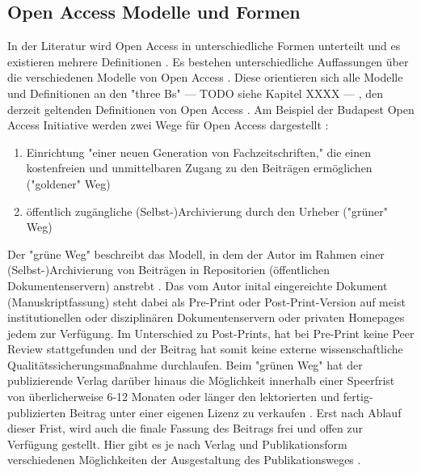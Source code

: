 \subsection{Open Access Modelle und Formen}

In der Literatur wird Open Access in unterschiedliche Formen unterteilt und es existieren mehrere Definitionen \cite{CREATe_2014} \cite{albert_2006_open_implications}. Es bestehen unterschiedliche Auffassungen über die verschiedenen Modelle von Open Access \cite{CREATe_2014} \cite{cite:22b} \cite{lewis_2012_inevitability}. Diese orientieren sich alle Modelle und Definitionen an den "three Bs" --- TODO siehe Kapitel XXXX --- , den derzeit geltenden Definitionen von Open Access \cite{Adema_2014_open_access}. Am Beispiel der Budapest Open Access Initiative werden zwei Wege für Open Access dargestellt \cite{albert_2006_open_implications}: 
\begin{enumerate}
\item Einrichtung "einer neuen Generation von Fachzeitschriften," die einen kostenfreien und unmittelbaren Zugang zu den Beiträgen ermöglichen ("goldener" Weg)
\item öffentlich zugängliche (Selbst-)Archivierung durch den Urheber ("grüner" Weg)
\end{enumerate}

Der "grüne Weg" beschreibt das Modell, in dem der Autor im Rahmen einer (Selbst-)Archivierung von Beiträgen in Repositorien (öffentlichen Dokumentenservern) anstrebt \cite{suchen}. Das vom Autor inital eingereichte Dokument (Manuskriptfassung) steht dabei als Pre-Print oder Post-Print-Version auf meist institutionellen oder disziplinären Dokumentenservern \cite{suchen} oder privaten Homepages \cite{suchen} jedem zur Verfügung. Im Unterschied zu Post-Prints, hat bei Pre-Print keine Peer Review stattgefunden \cite{suchen} und der Beitrag hat somit keine externe wissenschaftliche Qualitätssicherungsmaßnahme durchlaufen. Beim "grünen Weg" hat der publizierende Verlag darüber hinaus die Möglichkeit innerhalb einer Speerfrist von überlicherweise 6-12 Monaten \cite{suchen} oder länger den lektorierten und fertig-publizierten Beitrag unter einer eigenen Lizenz zu verkaufen \cite{suchen}. Erst nach Ablauf dieser Frist, wird auch die finale Fassung des Beitrags frei und offen zur Verfügung gestellt. Hier gibt es je nach Verlag und Publikationsform verschiedenen Möglichkeiten der Ausgestaltung des Publikationsweges \cite{suchen}.

